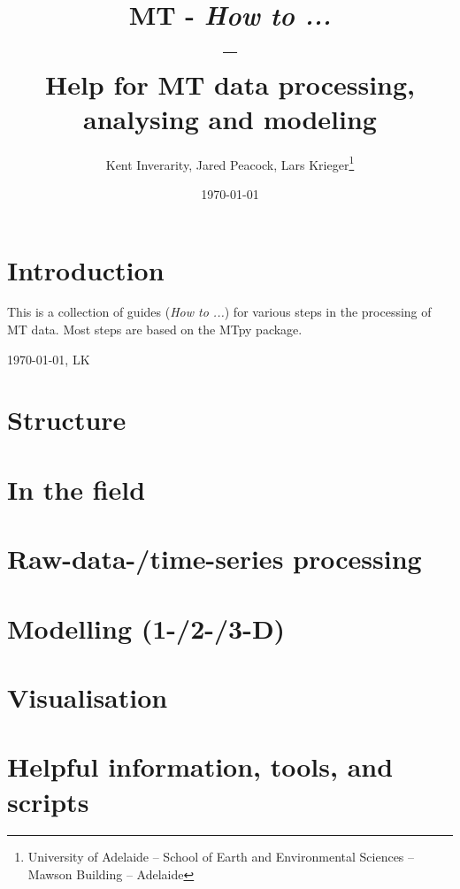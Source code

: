 \documentclass[%
onecolumn,%
11pt,%
DIV12%
]{scrreprt}
\title  {MT - \textit{How to ...}  \\ -- \\Help for MT data processing, analysing and modeling }
\author{Kent Inverarity, Jared Peacock, Lars Krieger\thanks{University of Adelaide -- School of Earth and Environmental Sciences -- Mawson Building -- Adelaide}
  }
\date{\today}
\begin{document}

\maketitle

\chapter*{Introduction}

This is a collection of guides (\textit{How to ...}) for various steps in the processing of MT data. Most steps are based on the MTpy package.

\vspace{4cm}
{\small \today, LK} 

\tableofcontents

\chapter{Structure}
\label{ch:Structure}



\chapter{In the field }
\label{ch:field}


\chapter{Raw-data-/time-series processing }
\label{ch:processing}


\chapter{Modelling (1-/2-/3-D) }
\label{ch:modeling}


\chapter{Visualisation }
\label{ch:visualisation}


\chapter{Helpful information, tools, and scripts}
\label{ch:tools}

\end{document}
